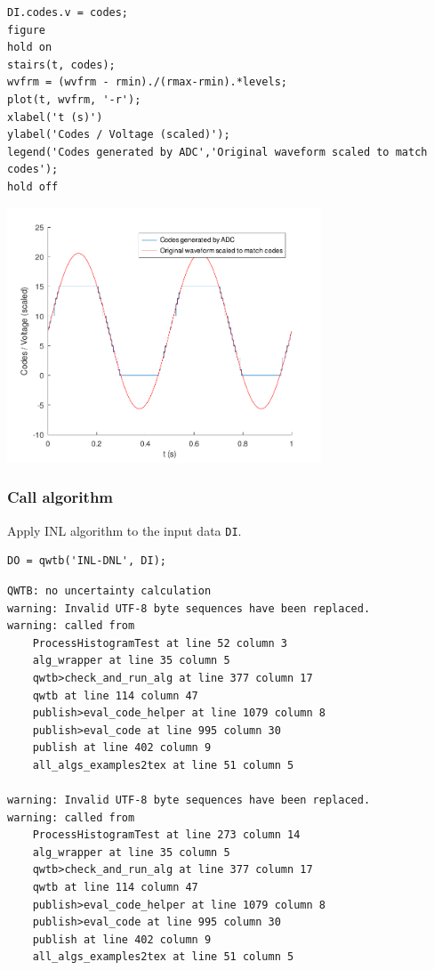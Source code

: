 \begin{lstlisting}
DI.codes.v = codes;
figure
hold on
stairs(t, codes);
wvfrm = (wvfrm - rmin)./(rmax-rmin).*levels;
plot(t, wvfrm, '-r');
xlabel('t (s)')
ylabel('Codes / Voltage (scaled)');
legend('Codes generated by ADC','Original waveform scaled to match codes');
hold off
\end{lstlisting}
\begin{center}
\includegraphics[width=0.7\textwidth]{algs_examples_published/INL-DNL_alg_example-1.pdf}
\end{center}


{}
\subsubsection*{Call algorithm}



Apply INL algorithm to the input data \texttt{DI}.

\begin{lstlisting}
DO = qwtb('INL-DNL', DI);
\end{lstlisting}
\begin{lstlisting}[language={},xleftmargin=5pt,frame=none]
QWTB: no uncertainty calculation
warning: Invalid UTF-8 byte sequences have been replaced.
warning: called from
    ProcessHistogramTest at line 52 column 3
    alg_wrapper at line 35 column 5
    qwtb>check_and_run_alg at line 377 column 17
    qwtb at line 114 column 47
    publish>eval_code_helper at line 1079 column 8
    publish>eval_code at line 995 column 30
    publish at line 402 column 9
    all_algs_examples2tex at line 51 column 5
 
warning: Invalid UTF-8 byte sequences have been replaced.
warning: called from
    ProcessHistogramTest at line 273 column 14
    alg_wrapper at line 35 column 5
    qwtb>check_and_run_alg at line 377 column 17
    qwtb at line 114 column 47
    publish>eval_code_helper at line 1079 column 8
    publish>eval_code at line 995 column 30
    publish at line 402 column 9
    all_algs_examples2tex at line 51 column 5
 

\end{lstlisting}



